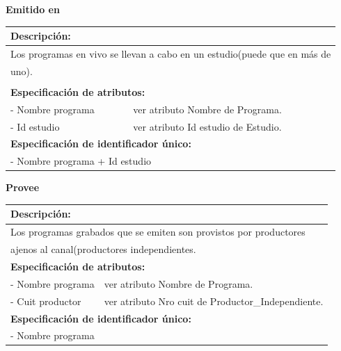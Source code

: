 \documentclass[a4paper,10pt]{article}
\begin{document}
    \begin{flushleft}
      \begin{large} \bf{Emitido en} \end{large}
    \end{flushleft}
      \begin{tabular}{| p{2cm} | p{9cm} |}
	\hline
	\multicolumn{2}{|l|}{\bf{Descripci\'on:}} \\
	\hline
	\multicolumn{2}{|l|}{Los programas en vivo se llevan a cabo en un estudio(puede que en m\'as de} \\
	\multicolumn{2}{|l|}{uno).} \\	
	\hline
	\multicolumn{2}{|l|}{} \\
	\hline	
	\multicolumn{2}{|l|}{\bf{Especificaci\'on de atributos:}} \\
	\hline
	- Nombre \newline programa & ver atributo Nombre de Programa. \\
	\hline \hline
	- Id estudio & ver atributo Id estudio de Estudio. \\
	\hline
	\multicolumn{2}{|l|}{\bf{Especificaci\'on de identificador \'unico:}} \\
	\hline
	\multicolumn{2}{|l|}{- Nombre programa + Id estudio} \\
	\hline
      \end{tabular}
      
      
    \begin{flushleft}
      \begin{large} \bf{Provee} \end{large}
    \end{flushleft}
      \begin{tabular}{| p{2cm} | p{9cm} |}
	\hline
	\multicolumn{2}{|l|}{\bf{Descripci\'on:}} \\
	\hline
	\multicolumn{2}{|l|}{Los programas grabados que se emiten son provistos por productores} \\
	\multicolumn{2}{|l|}{ajenos al canal(productores independientes.} \\	
	\hline		
	\multicolumn{2}{|l|}{\bf{Especificaci\'on de atributos:}} \\
	\hline
	- Nombre \newline programa & ver atributo Nombre de Programa. \\
	\hline \hline
	- Cuit \newline productor & ver atributo Nro cuit de Productor\_Independiente. \\
	\hline
	\multicolumn{2}{|l|}{\bf{Especificaci\'on de identificador \'unico:}} \\
	\hline
	\multicolumn{2}{|l|}{- Nombre programa} \\
	\hline
      \end{tabular}
\end{document}
